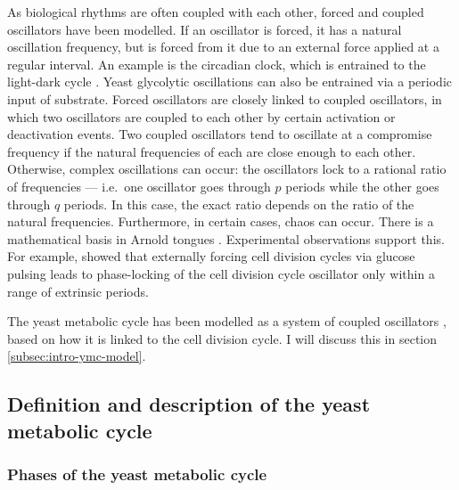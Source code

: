 As biological rhythms are often coupled with each other, forced and coupled oscillators have been modelled.
If an oscillator is forced, it has a natural oscillation frequency, but is forced from it due to an external force applied at a regular interval.
An example is the circadian clock, which is entrained to the light-dark cycle \parencite{goldbeterMultisynchronizationOtherPatterns}.
Yeast glycolytic oscillations can also be entrained via a periodic input of substrate.
Forced oscillators are closely linked to coupled oscillators, in which two oscillators are coupled to each other by certain activation or deactivation events.
Two coupled oscillators tend to oscillate at a compromise frequency if the natural frequencies of each are close enough to each other.
Otherwise, complex oscillations can occur: the oscillators lock to a rational ratio of frequencies --- i.e.\ one oscillator goes through $p$ periods while the other goes through $q$ periods.
In this case, the exact ratio depends on the ratio of the natural frequencies.
Furthermore, in certain cases, chaos can occur.
There is a mathematical basis in Arnold tongues \parencite{heltbergTaleTwoRhythms2021}.
Experimental observations support this.
For example, \textcite{charvinForcedPeriodicExpression2009} showed that externally forcing cell division cycles via glucose pulsing leads to phase-locking of the cell division cycle oscillator only within a range of extrinsic periods.

The yeast metabolic cycle has been modelled as a system of coupled oscillators \parencite{papagiannakisAutonomousMetabolicOscillations2017,ozsezenInferenceHighLevelInteraction2019}, based on how it is linked to the cell division cycle.
I will discuss this in section \ref{subsec:intro-ymc-model}.

\subsection{Definition and description of the yeast metabolic cycle}
\label{subsec:intro-ymc-definition}

\subsubsection{Phases of the yeast metabolic cycle}
\label{subsubsec:intro-ymc-definition-phases}

